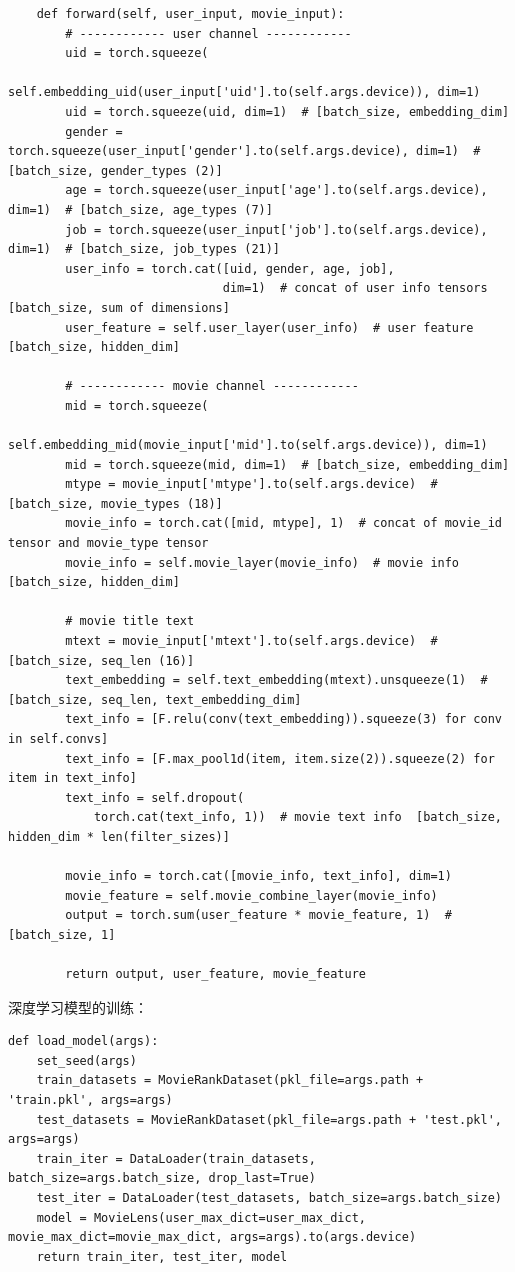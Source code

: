 \begin{spacing}{1.5}
\begin{lstlisting}
    def forward(self, user_input, movie_input):
        # ------------ user channel ------------
        uid = torch.squeeze(
            self.embedding_uid(user_input['uid'].to(self.args.device)), dim=1)
        uid = torch.squeeze(uid, dim=1)  # [batch_size, embedding_dim]
        gender = torch.squeeze(user_input['gender'].to(self.args.device), dim=1)  # [batch_size, gender_types (2)]
        age = torch.squeeze(user_input['age'].to(self.args.device), dim=1)  # [batch_size, age_types (7)]
        job = torch.squeeze(user_input['job'].to(self.args.device), dim=1)  # [batch_size, job_types (21)]
        user_info = torch.cat([uid, gender, age, job],
                              dim=1)  # concat of user info tensors  [batch_size, sum of dimensions]
        user_feature = self.user_layer(user_info)  # user feature  [batch_size, hidden_dim]
        
        # ------------ movie channel ------------
        mid = torch.squeeze(
            self.embedding_mid(movie_input['mid'].to(self.args.device)), dim=1)
        mid = torch.squeeze(mid, dim=1)  # [batch_size, embedding_dim]
        mtype = movie_input['mtype'].to(self.args.device)  # [batch_size, movie_types (18)]
        movie_info = torch.cat([mid, mtype], 1)  # concat of movie_id tensor and movie_type tensor
        movie_info = self.movie_layer(movie_info)  # movie info  [batch_size, hidden_dim]
        
        # movie title text
        mtext = movie_input['mtext'].to(self.args.device)  # [batch_size, seq_len (16)]
        text_embedding = self.text_embedding(mtext).unsqueeze(1)  # [batch_size, seq_len, text_embedding_dim]
        text_info = [F.relu(conv(text_embedding)).squeeze(3) for conv in self.convs]
        text_info = [F.max_pool1d(item, item.size(2)).squeeze(2) for item in text_info]
        text_info = self.dropout(
            torch.cat(text_info, 1))  # movie text info  [batch_size, hidden_dim * len(filter_sizes)]
        
        movie_info = torch.cat([movie_info, text_info], dim=1)
        movie_feature = self.movie_combine_layer(movie_info)
        output = torch.sum(user_feature * movie_feature, 1)  # [batch_size, 1]
        
        return output, user_feature, movie_feature
\end{lstlisting}\par
深度学习模型的训练：
\begin{lstlisting}
def load_model(args):
    set_seed(args)
    train_datasets = MovieRankDataset(pkl_file=args.path + 'train.pkl', args=args)
    test_datasets = MovieRankDataset(pkl_file=args.path + 'test.pkl', args=args)
    train_iter = DataLoader(train_datasets, batch_size=args.batch_size, drop_last=True)
    test_iter = DataLoader(test_datasets, batch_size=args.batch_size)
    model = MovieLens(user_max_dict=user_max_dict, movie_max_dict=movie_max_dict, args=args).to(args.device)
    return train_iter, test_iter, model



\end{lstlisting}
\end{spacing}
